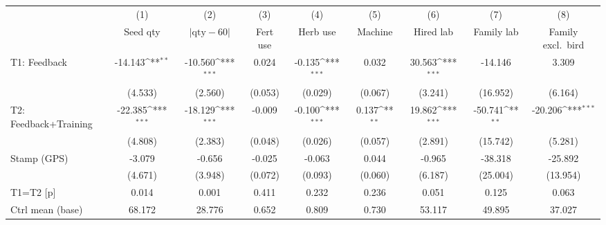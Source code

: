 {
\def\sym#1{\ifmmode^{#1}\else\(^{#1}\)\fi}
\begin{tabular}{l*{8}{c}}
\toprule
                    &\multicolumn{1}{c}{(1)}&\multicolumn{1}{c}{(2)}&\multicolumn{1}{c}{(3)}&\multicolumn{1}{c}{(4)}&\multicolumn{1}{c}{(5)}&\multicolumn{1}{c}{(6)}&\multicolumn{1}{c}{(7)}&\multicolumn{1}{c}{(8)}\\
                    &\multicolumn{1}{c}{Seed qty}&\multicolumn{1}{c}{$\vert \mathrm{qty} - 60 \vert$}&\multicolumn{1}{c}{Fert use}&\multicolumn{1}{c}{Herb use}&\multicolumn{1}{c}{Machine}&\multicolumn{1}{c}{Hired lab}&\multicolumn{1}{c}{Family lab}&\multicolumn{1}{c}{Family excl.\ bird}\\
\midrule
T1: Feedback        &     -14.143\sym{**} &     -10.560\sym{***}&       0.024         &      -0.135\sym{***}&       0.032         &      30.563\sym{***}&     -14.146         &       3.309         \\
                    &     (4.533)         &     (2.560)         &     (0.053)         &     (0.029)         &     (0.067)         &     (3.241)         &    (16.952)         &     (6.164)         \\
T2: Feedback+Training&     -22.385\sym{***}&     -18.129\sym{***}&      -0.009         &      -0.100\sym{***}&       0.137\sym{**} &      19.862\sym{***}&     -50.741\sym{**} &     -20.206\sym{***}\\
                    &     (4.808)         &     (2.383)         &     (0.048)         &     (0.026)         &     (0.057)         &     (2.891)         &    (15.742)         &     (5.281)         \\
Stamp (GPS)         &      -3.079         &      -0.656         &      -0.025         &      -0.063         &       0.044         &      -0.965         &     -38.318         &     -25.892         \\
                    &     (4.671)         &     (3.948)         &     (0.072)         &     (0.093)         &     (0.060)         &     (6.187)         &    (25.004)         &    (13.954)         \\
\midrule
T1=T2 [p]           &       0.014         &       0.001         &       0.411         &       0.232         &       0.236         &       0.051         &       0.125         &       0.063         \\
Ctrl mean (base)    &      68.172         &      28.776         &       0.652         &       0.809         &       0.730         &      53.117         &      49.895         &      37.027         \\

\end{tabular}}
